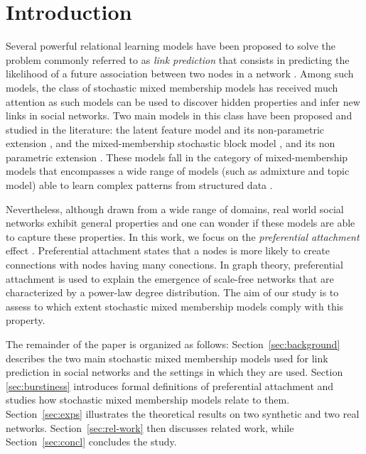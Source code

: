
\section{Introduction}
\label{sec:intro}

Several powerful relational learning models have been proposed to solve the problem commonly referred to as \textit{link prediction} that consists in predicting the likelihood of a future association between two nodes in a network \cite{LibenNowell07,HassanZaki11}. Among such models, the class of stochastic mixed membership models has received much attention as such models can be used to discover hidden properties and infer new links in social networks. Two main models in this class have been proposed and studied in the literature: the latent feature model \cite{BMF} and its non-parametric extension \cite{ILFRM}, and the mixed-membership stochastic block model \cite{MMSB}, and its non parametric extension \cite{iMMSB,fan2015dynamic}. These models fall in the category of mixed-membership models that encompasses a wide range of models (such as admixture and topic model) able to  learn complex patterns from structured data \cite{airoldi2014handbook}.

Nevertheless, although drawn from a wide range of domains, real world social networks exhibit general properties and one can wonder if these models are able to capture these properties. In this work, we focus on the \textit{preferential attachment} effect \cite{Newman2010, Barabasi2003}. Preferential attachment states that a nodes is more likely to create connections with nodes having many conections. In graph theory, preferential attachment is used to explain the emergence of scale-free networks that are characterized by a power-law degree distribution. The aim of our study is to assess to which extent stochastic mixed membership models comply with this property.

The remainder of the paper is organized as follows:  Section~\ref{sec:background} describes the two main stochastic mixed membership models used for link prediction in social networks and the settings in which they are used. Section \ref{sec:burstiness} introduces formal definitions of preferential attachment and studies how stochastic mixed membership models relate to them. Section~\ref{sec:exps} illustrates the theoretical results on two synthetic and two real networks. Section~\ref{sec:rel-work} then discusses related work, while Section~\ref{sec:concl} concludes the study.
